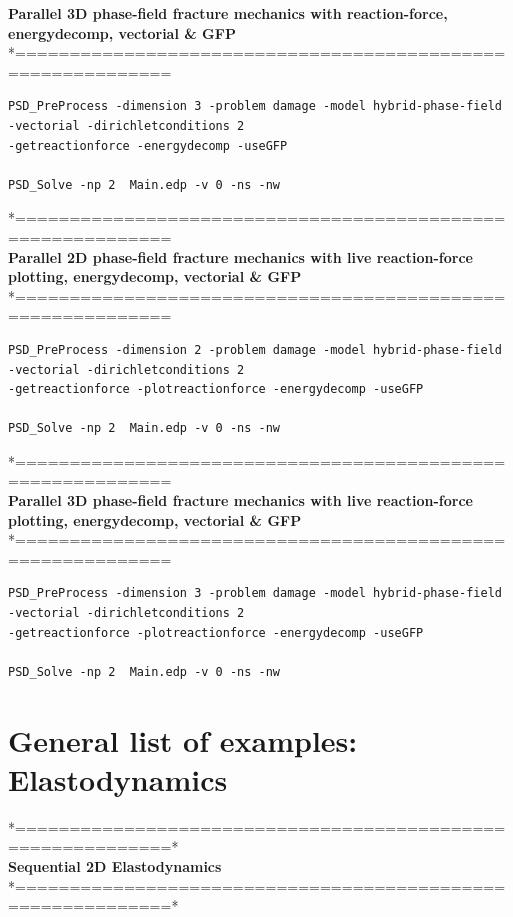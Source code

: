 \textbf{ Parallel 3D phase-field fracture mechanics with reaction-force, energydecomp, vectorial \& GFP} \\
*============================================================\\
\begin{lstlisting}[style=Linux]
PSD_PreProcess -dimension 3 -problem damage -model hybrid-phase-field -vectorial -dirichletconditions 2 
-getreactionforce -energydecomp -useGFP   

PSD_Solve -np 2  Main.edp -v 0 -ns -nw   	
\end{lstlisting}
*============================================================\\
 \textbf{Parallel 2D phase-field fracture mechanics with live reaction-force plotting, energydecomp, vectorial \& GFP} \\
*============================================================\\
\begin{lstlisting}[style=Linux]
PSD_PreProcess -dimension 2 -problem damage -model hybrid-phase-field -vectorial -dirichletconditions 2 
-getreactionforce -plotreactionforce -energydecomp -useGFP  

PSD_Solve -np 2  Main.edp -v 0 -ns -nw   
\end{lstlisting}
*============================================================\\
\textbf{ Parallel 3D phase-field fracture mechanics with live reaction-force plotting, energydecomp, vectorial \& GFP} \\
*============================================================\\
\begin{lstlisting}[style=Linux]
PSD_PreProcess -dimension 3 -problem damage -model hybrid-phase-field -vectorial -dirichletconditions 2 
-getreactionforce -plotreactionforce -energydecomp -useGFP   

PSD_Solve -np 2  Main.edp -v 0 -ns -nw   	
\end{lstlisting}

\section{General list of examples: Elastodynamics}

*============================================================*\\
\textbf{ Sequential 2D Elastodynamics}  \\                    
*============================================================*\\

